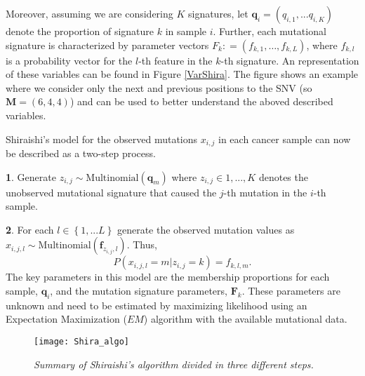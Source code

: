 \documentclass[a4paper]{article}
\begin{document}
Moreover, assuming we are considering $K$ signatures, let $\textbf{q}_i=\left(q_{i,1},...q_{i,K}\right)$ denote the proportion of signature $k$ in sample $i$. Further, each mutational signature is characterized by parameter vectors $F_k: = (f_{k, 1}, …, f_{k, L})$, where $f_{k, l}$ is a probability vector for the $l$-th feature in the $k$-th signature. An representation of these variables can be found in Figure \ref{VarShira}. The figure shows an example where we consider only the next and previous positions to the SNV (so $\textbf{M}=(6,4,4)$) and can be used to better understand the aboved described variables. 

Shiraishi's model for the observed mutations $x_{i, j}$ in each cancer sample can now be described as a two-step process.

\textbf{1}. Generate $z_{i,j} \sim \text{Multinomial}(\textbf{q}_m)$ where $z_{i,j}\in {1,..., K}$ denotes the unobserved mutational signature that caused the $j$-th mutation in the $i$-th sample. 

\textbf{2}. For each $l\in \left\{1,... L\right\}$ generate the observed mutation values as $x_{i,j,l} \sim \text{Multinomial}\left(\textbf{f}_{z_{i,j},l}\right)$. Thus,
\begin{equation*}
P(x_{i,j,l}=m|z_{i,j}=k)=f_{k,l,m}.
\end{equation*}
The key parameters in this model are the membership proportions for each sample, $\textbf{q}_i$, and the mutation signature parameters, $\textbf{F}_k$. These parameters are unknown and need to be estimated by maximizing likelihood using an Expectation Maximization ($EM$) algorithm with the available mutational data. 

\begin{figure}[h] 
	\centering
	\texttt{[image: Shira\_algo]} 
	\caption{\textit{Summary of Shiraishi's algorithm divided in three different steps.}} \label{AlgShira}
\end{figure}
\end{document}
